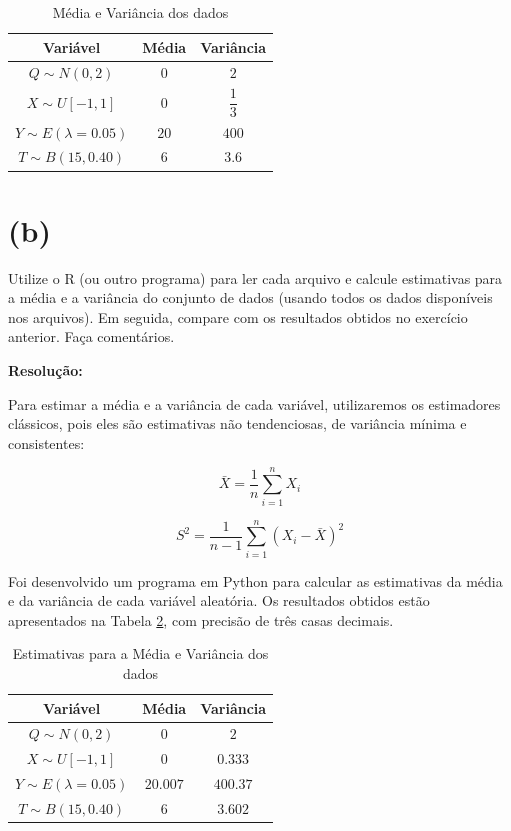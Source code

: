 \documentclass[]{abntex2}
\begin{document}
\begin{table}[H]
    \centering
    \begin{tabular}{|c|c|c|}
        \hline
        \textbf{Variável} & \textbf{Média} & \textbf{Variância} \\
        \hline
        $Q \sim N(0, 2)$ & $0$ & $2$ \\
        $X \sim U[-1, 1]$ & $0$ & $\dfrac{1}{3}$ \\
        $Y \sim E(\lambda = 0.05)$ & $20$ & $400$ \\
        $T \sim B(15, 0.40)$ & $6$ & $3.6$ \\
        \hline
    \end{tabular}
    \caption{Média e Variância dos dados}
    \label{tab:medvar}
\end{table}

\section*{\textbf{(b)}}

\noindent Utilize o R (ou outro programa) para ler cada arquivo e calcule estimativas para a
média e a variância do conjunto de dados (usando todos os dados disponíveis nos
arquivos). Em seguida, compare com os resultados obtidos no exercício anterior.
Faça comentários.

\textbf{Resolução:}

Para estimar a média e a variância de cada variável, utilizaremos os estimadores clássicos, pois eles são estimativas não tendenciosas, de variância mínima e consistentes:

\[
\bar{X} = \dfrac{1}{n} \sum_{i=1}^{n} X_i
\]

\[
S^2 = \dfrac{1}{n-1} \sum_{i=1}^{n} (X_i - \bar{X})^2
\]

Foi desenvolvido um programa em Python para calcular as estimativas da média e da variância de cada variável aleatória. Os resultados obtidos estão apresentados na Tabela \ref{tab:esti}, com precisão de três casas decimais.

\begin{table}[H]
    \centering
    \begin{tabular}{|c|c|c|}
        \hline
        \textbf{Variável} & \textbf{Média} & \textbf{Variância} \\
        \hline
        $Q \sim N(0, 2)$ & $ 0 $ & $2$ \\
        $X \sim U[-1, 1]$ & $0$ & $0.333$ \\
        $Y \sim E(\lambda = 0.05)$ & $20.007$ & $400.37$ \\
        $T \sim B(15, 0.40)$ & $6$ & $3.602$ \\
        \hline
    \end{tabular}
    \caption{Estimativas para a Média e Variância dos dados}
    \label{tab:esti}
\end{table}
\end{document}
